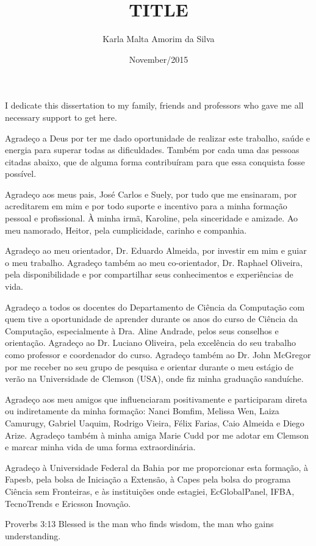 \documentclass[en,twoside,onehalfspacing,bsc]{risethesis}
\title{TITLE}
\date{November/2015}
\author{Karla Malta Amorim da Silva}
\begin{document}
\frontmatter
\frontpage
\presentationpage

\begin{dedicatory}
I dedicate this dissertation to my family, friends and
professors who gave me all necessary support to get here.
\end{dedicatory}

\acknowledgements
Agradeço a Deus por ter me dado oportunidade de realizar este trabalho, saúde
e energia para superar todas as dificuldades. Também por cada uma das pessoas
citadas abaixo, que de alguma forma contribuíram para que essa conquista fosse possível.

Agradeço aos meus pais, José Carlos e Suely, por tudo que me ensinaram, por
acreditarem em mim e por todo suporte e incentivo para a minha formação
pessoal e profissional. À minha irmã, Karoline, pela sinceridade e amizade. Ao
meu namorado, Heitor, pela cumplicidade, carinho e companhia.

Agradeço ao meu orientador, Dr. Eduardo Almeida, por investir em mim e guiar o
meu trabalho. Agradeço também ao meu co-orientador, Dr. Raphael Oliveira, pela
disponibilidade e por compartilhar seus conhecimentos e experiências de vida.

Agradeço a todos os docentes do Departamento de Ciência da Computação com
quem tive a oportunidade de aprender durante os anos do curso de Ciência da
Computação, especialmente à Dra. Aline Andrade, pelos seus conselhos e
orientação. Agradeço ao Dr. Luciano Oliveira, pela excelência do seu
trabalho como professor e  coordenador do curso.  Agradeço também ao Dr. John
McGregor por me receber no seu grupo de pesquisa e orientar durante o meu
estágio de verão na Universidade de Clemson (USA), onde fiz minha graduação sanduíche.

Agradeço aos meu amigos que influenciaram positivamente e participaram direta ou
indiretamente da minha formação: Nanci Bomfim, Melissa Wen, Laiza Camurugy,
Gabriel Uaquim, Rodrigo Vieira, Félix Farias, Caio Almeida e Diego Arize.
Agradeço também à minha amiga Marie Cudd por me adotar em Clemson e marcar
minha vida de uma forma extraordinária.

Agradeço à Universidade Federal da Bahia por me proporcionar esta formação,
à Fapesb, pela bolsa de Iniciação a Extensão, à Capes pela bolsa do
programa Ciência sem Fronteiras, e às instituições onde estagiei, EcGlobalPanel,
IFBA, TecnoTrends e Ericsson Inovação. 


\begin{epigraph}[]{Proverbs 3:13}
Blessed is the man who finds wisdom, the man who gains understanding. 
\end{epigraph}
\end{document}
